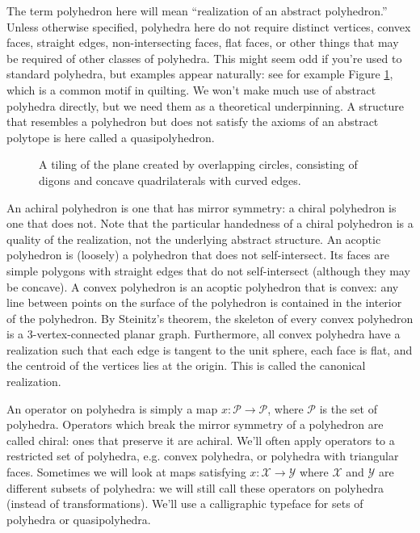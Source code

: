\documentclass{amsart}[12pt]
\begin{document}
The term polyhedron here will mean ``realization of an abstract polyhedron.''
Unless otherwise specified, polyhedra here do not require distinct vertices,
convex faces, straight edges, non-intersecting faces, flat faces, or other
things that may be required of other classes of polyhedra. This might seem
odd if you're used to standard polyhedra, but examples appear naturally: see
for example Figure \ref{fig:circlesquare}, which is a common motif in quilting.
We won't make much
use of abstract polyhedra directly, but we need them as a theoretical
underpinning. A structure that resembles a polyhedron but does not satisfy the
axioms of an abstract polytope is here called a quasipolyhedron.
\begin{figure}

\caption{A tiling of the plane created by overlapping circles, consisting of
digons and concave quadrilaterals with curved edges.}
\label{fig:circlesquare}
\end{figure}

An achiral polyhedron is one that has mirror symmetry: a chiral polyhedron is
one that does not. Note that the particular handedness of a chiral polyhedron
is a quality of the realization, not the underlying abstract structure.
An acoptic polyhedron is (loosely) a polyhedron that does not
self-intersect. \cite{grunbaum2} Its faces are simple polygons with straight
edges that do not self-intersect (although they may be concave). A convex
polyhedron is an acoptic polyhedron that is convex: any line between points on
the surface of the polyhedron is contained in the interior of the polyhedron.
By Steinitz's theorem, the skeleton of every convex polyhedron is a
3-vertex-connected planar graph. Furthermore, all convex polyhedra have a
realization such that each edge is tangent to the unit sphere,
each face is flat, and the centroid of the vertices lies at the origin. This is
called the canonical realization.

An operator on polyhedra is simply a map $x : \mathcal{P} \to \mathcal{P}$,
where $\mathcal{P}$ is the set of polyhedra. Operators which break the mirror
symmetry of a polyhedron are called chiral: ones that preserve it are achiral.
We'll often apply operators to a restricted set of polyhedra, e.g. convex
polyhedra, or polyhedra with triangular faces. Sometimes we will look at maps
satisfying $x : \mathcal{X} \to \mathcal{Y}$ where $\mathcal{X}$ and
$\mathcal{Y}$ are different subsets of polyhedra: we will still call these
operators on polyhedra (instead of transformations). We'll use a calligraphic
typeface for sets of polyhedra or quasipolyhedra.
\end{document}
